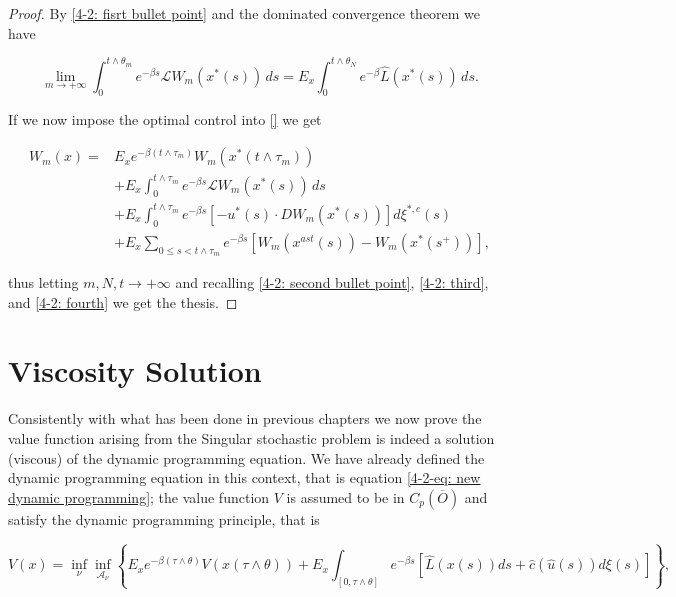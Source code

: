 \begin{theorem}
\begin{proof}
        By \ref{4-2: fisrt bullet point} and the dominated convergence theorem we have

        \begin{equation}
            \lim_{m\to+\infty}\int_0^{t\land\theta_m} e^{-\beta s}\mathcal{L}W_m(x^{\ast}(s))\,ds = E_{x}\int_0^{t\land\theta_N} e^{-\beta}\hat{L}(x^{\ast}(s))\,ds.
        \end{equation}

        If we now impose the optimal control into \eqref{} we get

        \begin{equation}
            \begin{aligned}
                W_m(x) = & E_xe^{-\beta (t\land\tau_m)}W_m(x^{\ast}(t\land\tau_m)) \\
                & + E_x \int_0^{t\land\tau_m} e^{-\beta s} \mathcal{L}W_m(x^{\ast}(s))\,ds \\
                & + E_x \int_0^{t\land\tau_m} e^{-\beta s} \left[-u^{\ast}(s)\cdot DW_m(x^{\ast}(s))\right]d\xi^{\ast,c}(s) \\
                & + E_x \sum_{0\leq s< t\land \tau_m} e^{-\beta s}\left[W_m(x^{ast}(s)) - W_m(x^{\ast}(s^+))\right],
            \end{aligned}
        \end{equation}

        thus letting $m,N,t\to+\infty$ and recalling \ref{4-2: second bullet point}, \ref{4-2: third}, and \ref{4-2: fourth} we get the thesis.
    \end{proof}
\end{theorem}


\section{Viscosity Solution}

Consistently with what has been done in previous chapters we now prove the value function arising from the Singular stochastic problem is indeed a solution (viscous) of the dynamic programming equation. We have already defined the dynamic programming equation in this context, that is equation \eqref{4-2-eq: new dynamic programming}; the value function $V$ is assumed to be in $C_p(\overline{O})$ and satisfy the dynamic programming principle, that is 

\begin{equation}\label{4-2-eq: porgramming principle}
    V(x) = \inf_{\nu} \inf_{\mathcal{A}_{\nu}} \left\{E_xe^{-\beta(\tau\land\theta)}V(x(\tau\land\theta)) + E_x\int_{[0,\tau\land\theta]}e^{-\beta s}\left[\hat{L}(x(s))ds + \hat{c}(\hat{u}(s))d\xi(s)\right]\right\},
\end{equation}

